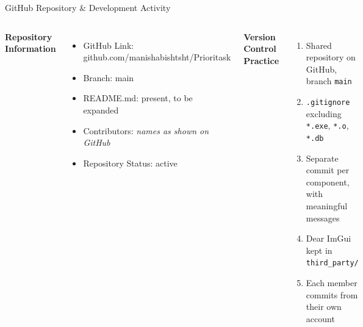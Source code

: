 \documentclass[aspectratio=169,11pt]{beamer}
\newcommand{\placeholder}[1]{%
\textit{\color{GEUGrey}#1}
}
\begin{document}
\begin{frame}{GitHub Repository \& Development Activity}

\begin{columns}[T,totalwidth=\textwidth]


\textbf{\color{GEUBlue}Repository Information}

\begin{itemize}\itemsep3pt
\scriptsize
\item GitHub Link: github.com/manishabishtsht/Prioritask
\item Branch: main
\item README.md: present, to be expanded
\item Contributors: \placeholder{names as shown on GitHub}
\item Repository Status: active
\end{itemize}


\textbf{\color{GEUBlue}Version Control Practice}

\begin{enumerate}\itemsep3pt
\scriptsize
\item Shared repository on GitHub, branch \texttt{main}
\item \texttt{.gitignore} excluding \texttt{*.exe}, \texttt{*.o},
      \texttt{*.db}
\item Separate commit per component, with meaningful messages
\item Dear ImGui kept in \texttt{third\_party/}
\item Each member commits from their own account
\end{enumerate}

\end{columns}

\vfill



\end{frame}
\end{document}
